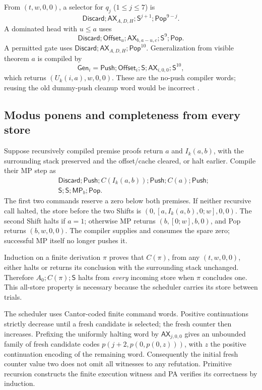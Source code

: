 \documentclass[11pt,letterpaper]{article}
\begin{document}
From $(t,w,0,0)$, a selector for $q_j$ ($1\le j\le7$) is
\[
 \mathsf{Discard};\mathsf{AX}_{A,D,H};\mathsf S^{j+1};\mathsf{Pop}^{9-j}.
\]
A dominated head with $u\le a$ uses
\[
 \mathsf{Discard};\mathsf{Offset}_u;
 \mathsf{AX}_{b,a-u,c};\mathsf S^9;\mathsf{Pop}.
\]
A permitted gate uses
$\mathsf{Discard};\mathsf{AX}_{A,D,H};\mathsf{Pop}^{10}$.
Generalization from visible theorem $a$ is compiled by
\[
 \mathsf{Gen}_i=\mathsf{Push};\mathsf{Offset}_i;\mathsf S;
                   \mathsf{AX}_{i,0,0};\mathsf S^{10},
\]
which returns $(U_k(i,a),w,0,0)$. These are the no-push compiler words;
reusing the old dummy-push cleanup word would be incorrect \cite{nopush}.

\subsection{Modus ponens and completeness from every store}

Suppose recursively compiled premise proofs return $a$ and $I_k(a,b)$, with
the surrounding stack preserved and the offset/cache cleared, or halt earlier.
Compile their MP step as
\[
\begin{aligned}
 &\mathsf{Discard};\mathsf{Push};C(I_k(a,b));\mathsf{Push};
 C(a);\mathsf{Push};\\
 &\mathsf S;\mathsf S;\mathsf{MP}_b;\mathsf{Pop}.
\end{aligned}
\]
The first two commands reserve a zero below both premises. If neither recursive
call halted, the store before the two Shifts is
$(0,[a,I_k(a,b),0;w],0,0)$. The second Shift halts if $a=1$; otherwise MP
returns $(b,[0;w],b,0)$, and Pop returns $(b,w,0,0)$. The compiler supplies
and consumes the spare zero; successful MP itself no longer pushes it.

Induction on a finite derivation $\pi$ proves that $C(\pi)$, from any
$(t,w,0,0)$, either halts or returns its conclusion with the surrounding stack
unchanged. Therefore $A_0;C(\pi);\mathsf S$ halts from \emph{every} incoming
store when $\pi$ concludes one. This all-store property is necessary because
the scheduler carries its store between trials.

The scheduler uses Cantor-coded finite command words. Positive continuations
strictly decrease until a fresh candidate is selected; the fresh counter then
increases. Prefixing the uniformly halting word by $\mathsf{AX}_{j,0,0}$ gives
an unbounded family of fresh candidate codes
$p(j+2,p(0,p(0,z)))$, with $z$ the positive continuation encoding of the
remaining word. Consequently the initial fresh counter value two does not omit
all witnesses to any refutation. Primitive recursion constructs the finite
execution witness and PA verifies its correctness by induction.
\end{document}
